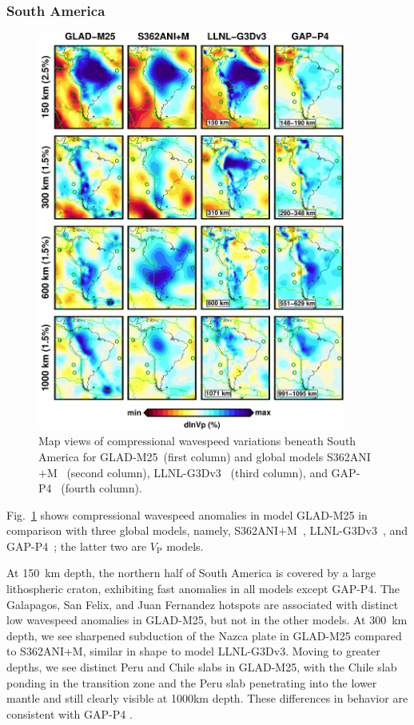 \documentclass[extra,mreferee]{gji}
\begin{document}
\subsubsection{South America}

\begin{figure}
  \includegraphics[width=0.9\textwidth]{figures/depth_slice/south_america_vp.pdf}
  \caption{Map views of compressional wavespeed variations beneath South America for GLAD-M25~(first column) and global models S362ANI$+$M~\citep{moulik2014anisotropic} (second column), LLNL-G3Dv3~\citep{simmons2012llnl} (third column), and GAP-P4~\citep{fukao2013subducted} (fourth column).}
  \label{fig:southamerica-vp}
  \centering
\end{figure}

Fig.~\ref{fig:southamerica-vp} shows compressional wavespeed anomalies in model GLAD-M25 in comparison with three
global models, namely, S362ANI$+$M~\citep{moulik2014anisotropic}, LLNL-G3Dv3~\citep{simmons2012llnl}, and GAP-P4~\citep{fukao2013subducted};
the latter two are $V_\textrm{P}$ models.

At 150~km depth, the northern half of South America is covered by a large lithospheric craton, exhibiting fast anomalies in all models except GAP-P4.
The Galapagos,
San Felix, and Juan Fernandez hotspots are associated with distinct low wavespeed anomalies in GLAD-M25,
but not in the other models.
At 300~km depth, we see sharpened subduction of the Nazca plate
in GLAD-M25 compared to S362ANI+M, similar in shape to model LLNL-G3Dv3.
Moving to greater depths,
we see distinct Peru and Chile slabs in GLAD-M25,
with the Chile slab ponding in the transition zone
and the Peru slab penetrating into the lower mantle and still clearly visible at 1000km depth.
These differences in behavior are consistent with GAP-P4
\citep{fukao2013subducted}.
\end{document}
